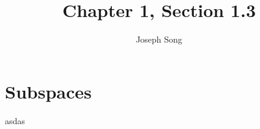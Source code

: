 \documentclass{article}
\title{Chapter 1, Section 1.3}
\author{Joseph Song}
\date{}
\begin{document}
\maketitle

\section{Subspaces}

asdas
\end{document}

